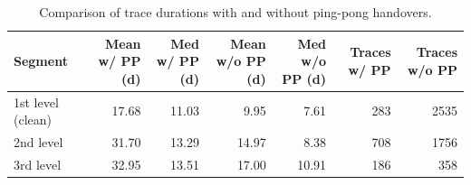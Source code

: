 \begin{table}[h]
\centering
\begin{tabular}{lrrrrrr}
\hline
Segment & Mean w/ PP (d) & Med w/ PP (d) & Mean w/o PP (d) & Med w/o PP (d) & Traces w/ PP & Traces w/o PP \\
\hline
1st level (clean) & 17.68 & 11.03 & 9.95 & 7.61 & 283 & 2535 \\
2nd level & 31.70 & 13.29 & 14.97 & 8.38 & 708 & 1756 \\
3rd level & 32.95 & 13.51 & 17.00 & 10.91 & 186 & 358 \\
\hline
\end{tabular}
\caption{Comparison of trace durations with and without ping-pong handovers.}
\label{tab:pingpong_duration_comparison}
\end{table}
